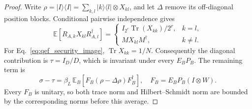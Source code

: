 \documentclass[11pt,a4paper]{article}
\begin{document}
{\begin{proof}
Write $\rho=|I\rangle\langle I|=\sum_{k,l}|k\rangle\langle l|\otimes X_{kl}$,
and let $\Delta$ remove its off-diagonal position blocks. Conditional
pairwise independence gives
\begin{equation}
 \mathbb E[R_{A,k}X_{kl}R_{A,l}^{\dagger}]
 =\begin{cases}
 I_{2^r}\operatorname{Tr}(X_{kk})/2^r,&k=l,\\
 MX_{kl}M^{\dagger},&k\ne l.
 \end{cases}
\end{equation}
For Eq.~\eqref{eq:qef_security_image},
$\operatorname{Tr}X_{kk}=1/N$. Consequently the diagonal contribution
is $\tau=I_D/D$, which is invariant under every $E_BP_B$. The remaining
term is
\begin{equation}
 \sigma-\tau=\beta_L\,\mathbb E_B
  [F_B(\rho-\Delta\rho)F_B^{\dagger}],
 \quad F_B=E_BP_B(I\otimes W).
\label{eq:qef_off_diagonal_remainder}
\end{equation}
Every $F_B$ is unitary, so both trace norm and Hilbert--Schmidt norm
are bounded by the corresponding norms before this average.


\end{proof}}
\end{document}

